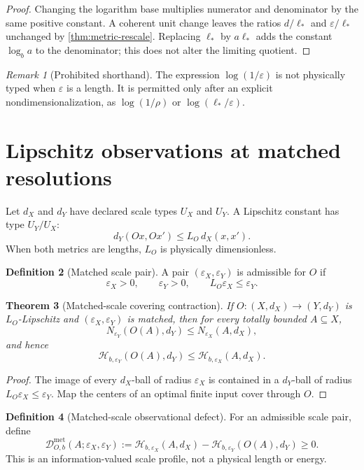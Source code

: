 \documentclass[11pt,a4paper]{article}
\theoremstyle{definition}
\newtheorem{definition}{Definition}[section]
\theoremstyle{plain}
\newtheorem{theorem}[definition]{Theorem}
\theoremstyle{remark}
\newtheorem{remark}[definition]{Remark}
\newcommand{\Hmet}{\mathscr{H}}
\newcommand{\Dmet}{\mathscr{D}^{\mathrm{met}}}
\begin{document}
\begin{proof}
Changing the logarithm base multiplies numerator and denominator by the
same positive constant. A coherent unit change leaves the ratios
$d/\ell_*$ and $\varepsilon/\ell_*$ unchanged by
\cref{thm:metric-rescale}. Replacing $\ell_*$ by $a\ell_*$ adds the constant
$\log_b a$ to the denominator; this does not alter the limiting quotient.
\end{proof}

\begin{remark}[Prohibited shorthand]
The expression $\log(1/\varepsilon)$ is not physically typed when
$\varepsilon$ is a length. It is permitted only after an explicit
nondimensionalization, as $\log(1/\rho)$ or
$\log(\ell_*/\varepsilon)$.
\end{remark}

\section{Lipschitz observations at matched resolutions}

Let $d_X$ and $d_Y$ have declared scale types $U_X$ and $U_Y$. A Lipschitz
constant has type $U_Y/U_X$:
\[
d_Y(Ox,Ox')
\leq
L_O\,d_X(x,x').
\]
When both metrics are lengths, $L_O$ is physically dimensionless.

\begin{definition}[Matched scale pair]
A pair $(\varepsilon_X,\varepsilon_Y)$ is admissible for $O$ if
\[
\varepsilon_X>0,\qquad
\varepsilon_Y>0,\qquad
L_O\varepsilon_X\leq\varepsilon_Y.
\]
\end{definition}

\begin{theorem}[Matched-scale covering contraction]
\label{thm:matched-contraction}
If $O:(X,d_X)\to(Y,d_Y)$ is $L_O$-Lipschitz and
$(\varepsilon_X,\varepsilon_Y)$ is matched, then for every totally bounded
$A\subseteq X$,
\[
N_{\varepsilon_Y}(O(A),d_Y)
\leq
N_{\varepsilon_X}(A,d_X),
\]
and hence
\[
\Hmet_{b,\varepsilon_Y}(O(A),d_Y)
\leq
\Hmet_{b,\varepsilon_X}(A,d_X).
\]
\end{theorem}

\begin{proof}
The image of every $d_X$-ball of radius $\varepsilon_X$ is contained in a
$d_Y$-ball of radius $L_O\varepsilon_X\leq\varepsilon_Y$. Map the centers
of an optimal finite input cover through $O$.
\end{proof}

\begin{definition}[Matched-scale observational defect]
\label{def:metric-defect}
For an admissible scale pair, define
\[
\Dmet_{O,b}(A;\varepsilon_X,\varepsilon_Y)
:=
\Hmet_{b,\varepsilon_X}(A,d_X)
-
\Hmet_{b,\varepsilon_Y}(O(A),d_Y)
\geq0.
\]
This is an information-valued scale profile, not a physical length or
energy.
\end{definition}
\end{document}

